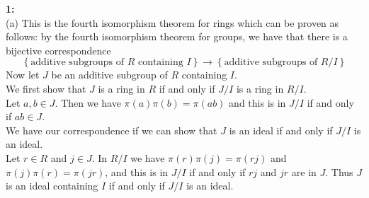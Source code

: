 \documentclass[a4paper]{article}
\begin{document}
    \textbf{1:}\\
    (a) This is the fourth isomorphism theorem for rings which can be proven as
    follows:
    by the fourth isomorphism theorem for groups, we have that there
    is a bijective correspondence
    \[
        \left\{ \text{additive subgroups of } R \text{ containing } I \right\} 
        \to \left\{ \text{additive subgroups of } R /I \right\} 
    \] 
    Now let $J$ be an additive subgroup of $R$ containing $I$.\\
    \linebreak
    We first show that $J$ is a ring in $R$ if and only if $J /I$ is a ring in
    $R /I$.\\
    Let $a,b \in J$. Then we have $\pi (a) \pi(b) = \pi(ab)$ and this is in
    $J /I$ if and only if $ab \in J$.\\
    \linebreak
    We have our correspondence if we can show that $J$ is an ideal if and only
    if $J /I$ is an ideal.\\
    
    Let $r \in R$ and $j \in J$.
    In $R/I$ we have $\pi (r) \pi(j) = \pi(rj)$ and $\pi(j) \pi(r) = \pi(jr)$,
    and this is in $J /I$ if and only if $rj$ and $jr$ are in  $J$.
    Thus $J$ is an ideal containing $I$ if and only if $J /I$ is an ideal.\\
    \linebreak
    
\end{document}
